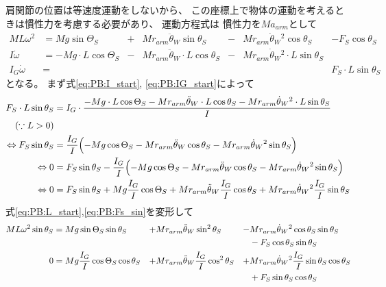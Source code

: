 \documentclass[a4paper,11pt]{jsarticle}
\begin{document}
肩関節の位置は等速度運動をしないから、
この座標上で物体の運動を考えるときは慣性力を考慮する必要があり、
運動方程式は
慣性力を$Ma_{arm}$として
\begin{align}
  ML\omega^2 
  &= Mg\sin\Theta_S 
  &+& Mr_{arm}\ddot{\theta}_W\sin\theta_S 
  &-& Mr_{arm}\dot{\theta}_W{}^2\cos\theta_S 
  &- F_S\cos\theta_S
  \label{eq:PB:L_start}
  \\
  I\dot\omega 
  &= -Mg \cdot L\cos\Theta_S
  &-& Mr_{arm}\ddot{\theta}_W \cdot L \cos\theta_S
  &-& Mr_{arm}\dot{\theta}_W{}^2 \cdot L \sin\theta_S
  &
  \label{eq:PB:I_start}
  \\
  I_G\dot\omega &= & & & & & F_S \cdot L \sin\theta_S
  \label{eq:PB:IG_start}
\end{align}
となる。
まず式\ref{eq:PB:I_start}, \ref{eq:PB:IG_start}によって
\begin{align}
  F_S \cdot L \sin\theta_S
  & = I_G \cdot 
  \frac{
    -Mg \cdot L\cos\Theta_S
    - Mr_{arm}\ddot{\theta}_W \cdot L \cos\theta_S
    - Mr_{arm}\dot{\theta}_W{}^2 \cdot L \sin\theta_S
  }{I}
  \notag
  \\
  \left( \because L > 0 \right) &
  \notag
  \\
  \Leftrightarrow
  F_S\sin\theta_S
  & = \frac{I_G}{I}
  \Bigl(
    -Mg \cos\Theta_S
    - Mr_{arm}\ddot{\theta}_W \cos\theta_S
    - Mr_{arm}\dot{\theta}_W{}^2 \sin\theta_S
  \Bigr)
  \notag
  \\
  \Leftrightarrow
  0
  & = F_S\sin\theta_S - \frac{I_G}{I}
  \Bigl(
    -Mg \cos\Theta_S
    - Mr_{arm}\ddot{\theta}_W \cos\theta_S
    - Mr_{arm}\dot{\theta}_W{}^2 \sin\theta_S
  \Bigr)
  \notag
  \\
  \Leftrightarrow
  0
  & = F_S\sin\theta_S
  +Mg \frac{I_G}{I}\cos\Theta_S
  +Mr_{arm}\ddot{\theta}_W \frac{I_G}{I}\cos\theta_S
  +Mr_{arm}\dot{\theta}_W{}^2 \frac{I_G}{I}\sin\theta_S
  \label{eq:PB:Fs_sin}
\end{align}
式\ref{eq:PB:L_start},\ref{eq:PB:Fs_sin}を変形して
\begin{align*}
  ML\omega^2 \sin\theta_S 
  &= Mg\sin\Theta_S \sin\theta_S
  &+& Mr_{arm}\ddot{\theta}_W\sin^2\theta_S
  &-& Mr_{arm}\dot{\theta}_W{}^2\cos\theta_S \sin\theta_S
  \notag
  \\
  &&&&&- F_S\cos\theta_S\sin\theta_S
  \\
  0
  &=  Mg\frac{I_G}{I}\cos\Theta_S\cos\theta_S
  &+& Mr_{arm}\ddot{\theta}_W \frac{I_G}{I}\cos^2\theta_S
  &+& Mr_{arm}\dot{\theta}_W{}^2 \frac{I_G}{I}\sin\theta_S\cos\theta_S
  \notag
  \\
  &&&&&+ F_S\sin\theta_S\cos\theta_S
\end{align*}
\end{document}
